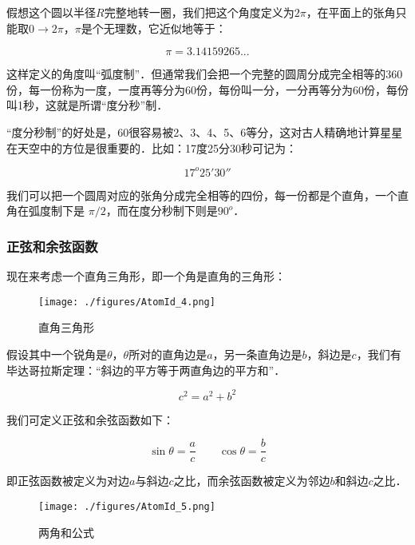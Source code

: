 假想这个圆以半径$R$完整地转一圈，我们把这个角度定义为$2 \pi$，在平面上的张角只能取$0 \to 2 \pi$，$\pi$是个无理数，它近似地等于：

\begin{equation}
\pi = 3.14159265 ...
\end{equation}

这样定义的角度叫“弧度制”．但通常我们会把一个完整的圆周分成完全相等的360份，每一份称为一度，一度再等分为60份，每份叫一分，一分再等分为60份，每份叫1秒，这就是所谓“度分秒”制．

“度分秒制”的好处是，60很容易被2、3、4、5、6等分，这对古人精确地计算星星在天空中的方位是很重要的．比如：17度25分30秒可记为：

\begin{equation}
17^o 25' 30''
\end{equation}

我们可以把一个圆周对应的张角分成完全相等的四份，每一份都是个直角，一个直角在弧度制下是 $\pi/2$，而在度分秒制下则是$90^o$．

\subsubsection{正弦和余弦函数}

现在来考虑一个直角三角形，即一个角是直角的三角形：

\begin{figure}[ht]
\centering
\texttt{[image: ./figures/AtomId\_4.png]}
\caption{直角三角形} \label{AtomId_fig4}
\end{figure}

假设其中一个锐角是$\theta$，$\theta$所对的直角边是$a$，另一条直角边是$b$，斜边是$c$，我们有毕达哥拉斯定理：“斜边的平方等于两直角边的平方和”．

\begin{equation}
c^2 = a^2 + b^2
\end{equation}

我们可定义正弦和余弦函数如下：

\begin{equation}
\sin \theta = \frac{a}{c} \qquad
\cos \theta = \frac{b}{c}
\end{equation}

即正弦函数被定义为对边$a$与斜边$c$之比，而余弦函数被定义为邻边$b$和斜边$c$之比．

\begin{figure}[ht]
\centering
\texttt{[image: ./figures/AtomId\_5.png]}
\caption{两角和公式} \label{AtomId_fig5}
\end{figure}


